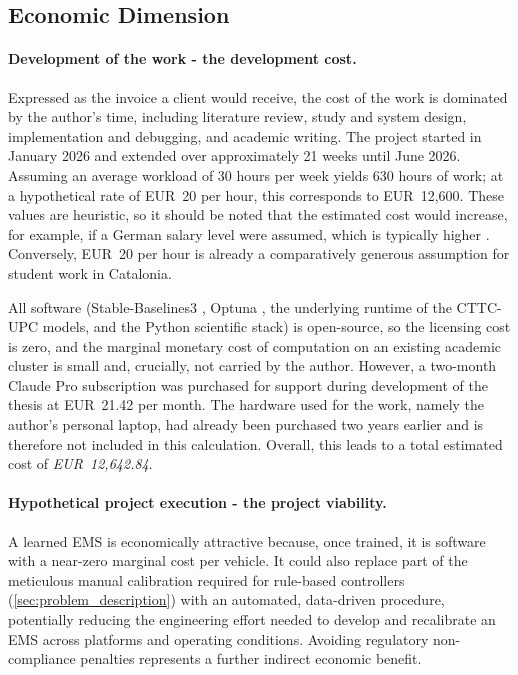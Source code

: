 \subsection{Economic Dimension}

\paragraph{Development of the work - the development cost.} Expressed as the invoice a client would receive, the cost of the work is dominated by the author's time, including literature review, study and system design, implementation and debugging, and academic writing. The project started in January 2026 and extended over approximately 21 weeks until June 2026. Assuming an average workload of 30 hours per week yields 630 hours of work; at a hypothetical rate of EUR~20 per hour, this corresponds to EUR~12{,}600. These values are heuristic, so it should be noted that the estimated cost would increase, for example, if a German salary level were assumed, which is typically higher \cite{statistisches_bundesamt_earnings_nodate}. Conversely, EUR~20 per hour is already a comparatively generous assumption for student work in Catalonia.

All software (Stable-Baselines3 \cite{raffin_stable-baselines3_2021}, Optuna \cite{akiba_optuna_2019}, the underlying runtime of the CTTC-UPC models, and the Python scientific stack) is open-source, so the licensing cost is zero, and the marginal monetary cost of computation on an existing academic cluster is small and, crucially, not carried by the author. However, a two-month Claude Pro \cite{anthropic_claude_nodate} subscription was purchased for support during development of the thesis at EUR~21.42 per month. The hardware used for the work, namely the author's personal laptop, had already been purchased two years earlier and is therefore not included in this calculation. Overall, this leads to a total estimated cost of \emph{EUR~12{,}642.84}.

\paragraph{Hypothetical project execution - the project viability.} A learned \ac{EMS} is economically attractive because, once trained, it is software with a near-zero marginal cost per vehicle. It could also replace part of the meticulous manual calibration required for rule-based controllers (\autoref{sec:problem_description}) with an automated, data-driven procedure, potentially reducing the engineering effort needed to develop and recalibrate an \ac{EMS} across platforms and operating conditions. Avoiding regulatory non-compliance penalties represents a further indirect economic benefit.

